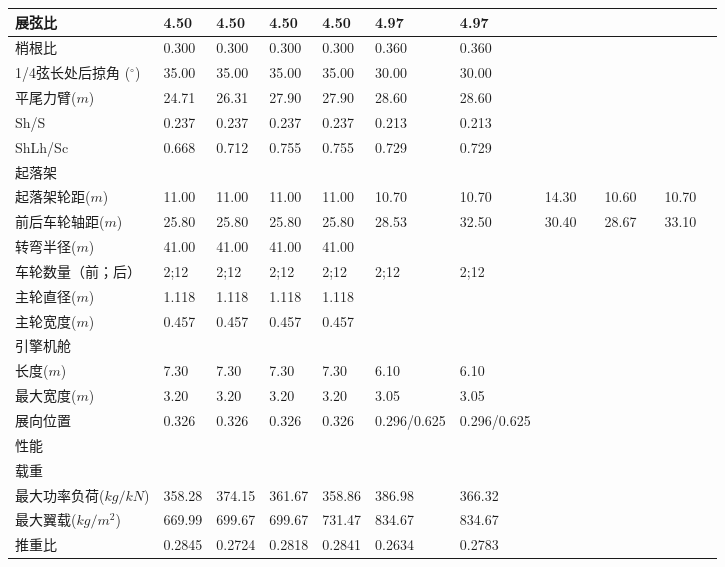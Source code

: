\documentclass[12pt,a4paper]{report}
\begin{document}
\begin{landscape}
\begin{center}
\begin{longtable}{|p{1.5cm}|p{1.3cm}|p{1.1cm}|p{1.1cm}|p{1.1cm}|p{1.1cm}|p{1.1cm}|p{1.1cm}|p{1.1cm}|p{1.1cm}|p{1.1cm}|p{1.1cm}|p{1.1cm}|}
展弦比	&	4.50	&	4.50	&	4.50	&	4.50	&	4.97	&	4.97	&		&		&		&		&		&		\\ \hline
梢根比	&	0.300	&	0.300	&	0.300	&	0.300	&	0.360	&	0.360	&		&		&		&		&		&		\\ \hline
1/4弦长处后掠角 ($^\circ$)	&	35.00	&	35.00	&	35.00	&	35.00	&	30.00	&	30.00	&		&		&		&		&		&		\\ \hline
平尾力臂($m$)	&	24.71	&	26.31	&	27.90	&	27.90	&	28.60	&	28.60	&		&		&		&		&		&		\\ \hline
Sh/S	&	0.237	&	0.237	&	0.237	&	0.237	&	0.213	&	0.213	&		&		&		&		&		&		\\ \hline
ShLh/Sc	&	0.668	&	0.712	&	0.755	&	0.755	&	0.729	&	0.729	&		&		&		&		&		&		\\ \hline
起落架	&		&		&		&		&		&		&		&		&		&		&		&		\\ \hline
起落架轮距($m$)	&	11.00	&	11.00	&	11.00	&	11.00	&	10.70	&	10.70	&	14.30	&		&	10.60	&		&	10.70	&		\\ \hline
前后车轮轴距($m$)	&	25.80	&	25.80	&	25.80	&	25.80	&	28.53	&	32.50	&	30.40	&		&	28.67	&		&	33.10	&		\\ \hline
转弯半径($m$)	&	41.00	&	41.00	&	41.00	&	41.00	&		&		&		&		&		&		&		&		\\ \hline
车轮数量（前；后）	&	2;12	&	2;12	&	2;12	&	2;12	&	2;12	&	2;12	&		&		&		&		&		&		\\ \hline
主轮直径($m$)	&	1.118	&	1.118	&	1.118	&	1.118	&		&		&		&		&		&		&		&		\\ \hline
主轮宽度($m$)	&	0.457	&	0.457	&	0.457	&	0.457	&		&		&		&		&		&		&		&		\\ \hline
引擎机舱	&		&		&		&		&		&		&		&		&		&		&		&		\\ \hline
长度($m$)	&	7.30	&	7.30	&	7.30	&	7.30	&	6.10	&	6.10	&		&		&		&		&		&		\\ \hline
最大宽度($m$)	&	3.20	&	3.20	&	3.20	&	3.20	&	3.05	&	3.05	&		&		&		&		&		&		\\ \hline
展向位置	&	0.326	&	0.326	&	0.326	&	0.326	&	0.296/0.625	&	0.296/0.625	&		&		&		&		&		&		\\ \hline
性能	&		&		&		&		&		&		&		&		&		&		&		&		\\ \hline
载重	&		&		&		&		&		&		&		&		&		&		&		&		\\ \hline
最大功率负荷($kg/kN$)	&	358.28	&	374.15	&	361.67	&	358.86	&	386.98	&	366.32	&		&		&		&		&		&		\\ \hline
最大翼载($kg/m^2$)	&	669.99	&	699.67	&	699.67	&	731.47	&	834.67	&	834.67	&		&		&		&		&		&		\\ \hline
推重比	&	0.2845	&	0.2724	&	0.2818	&	0.2841	&	0.2634	&	0.2783	&		&		&		&		&		&		\\ \hline

\end{longtable}
\end{center}
\end{landscape}
\end{document}

